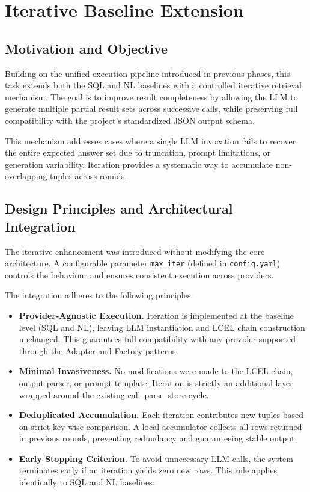 \section{Iterative Baseline Extension}

\subsection{Motivation and Objective}

Building on the unified execution pipeline introduced in previous phases, this task
extends both the SQL and NL baselines with a controlled iterative retrieval mechanism.
The goal is to improve result completeness by allowing the LLM to generate multiple
partial result sets across successive calls, while preserving full compatibility with the
project’s standardized JSON output schema.

This mechanism addresses cases where a single LLM invocation fails to recover the
entire expected answer set due to truncation, prompt limitations, or generation
variability. Iteration provides a systematic way to accumulate non-overlapping tuples
across rounds.

\subsection{Design Principles and Architectural Integration}

The iterative enhancement was introduced without modifying the core architecture.
A configurable parameter \texttt{max\_iter} (defined in \texttt{config.yaml}) controls the
behaviour and ensures consistent execution across providers.

The integration adheres to the following principles:

\begin{itemize}
    \item \textbf{Provider-Agnostic Execution.} Iteration is implemented at the baseline level 
    (SQL and NL), leaving LLM instantiation and LCEL chain construction unchanged.
    This guarantees full compatibility with any provider supported through the Adapter 
    and Factory patterns.

    \item \textbf{Minimal Invasiveness.} No modifications were made to the LCEL chain,
    output parser, or prompt template. Iteration is strictly an additional layer wrapped
    around the existing call--parse--store cycle.

    \item \textbf{Deduplicated Accumulation.} Each iteration contributes new tuples 
    based on strict key-wise comparison. A local accumulator collects all rows returned 
    in previous rounds, preventing redundancy and guaranteeing stable output.

    \item \textbf{Early Stopping Criterion.} To avoid unnecessary LLM calls, the system
    terminates early if an iteration yields zero new rows. This rule applies identically
    to SQL and NL baselines.
\end{itemize}

